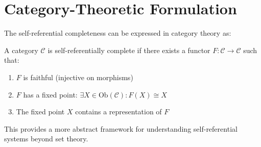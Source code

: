 \section{Category-Theoretic Formulation}

The self-referential completeness can be expressed in category theory as:

\begin{definition}
A category $\mathcal{C}$ is self-referentially complete if there exists a functor $F: \mathcal{C} \to \mathcal{C}$ such that:
\begin{enumerate}
\item $F$ is faithful (injective on morphisms)
\item $F$ has a fixed point: $\exists X \in \text{Ob}(\mathcal{C}): F(X) \cong X$
\item The fixed point $X$ contains a representation of $F$
\end{enumerate}
\end{definition}

This provides a more abstract framework for understanding self-referential systems beyond set theory.